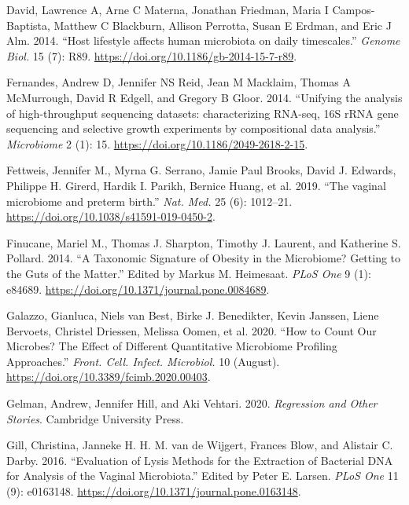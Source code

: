 \documentclass[
]{article}
\newlength{\cslhangindent}
\newlength{\cslentryspacingunit} %
\newenvironment{CSLReferences}[2] %
 {%
  \setlength{\parindent}{0pt}
  \ifodd #1
  \let\oldpar\par
  \def\par{\hangindent=\cslhangindent\oldpar}
  \fi
  \setlength{\parskip}{#2\cslentryspacingunit}
 }%
 {}
\begin{document}
\begin{CSLReferences}{1}{0}
\leavevmode{}%
David, Lawrence A, Arne C Materna, Jonathan Friedman, Maria I Campos-Baptista, Matthew C Blackburn, Allison Perrotta, Susan E Erdman, and Eric J Alm. 2014. {``{Host lifestyle affects human microbiota on daily timescales}.''} \emph{Genome Biol.} 15 (7): R89. \url{https://doi.org/10.1186/gb-2014-15-7-r89}.

\leavevmode{}%
Fernandes, Andrew D, Jennifer NS Reid, Jean M Macklaim, Thomas A McMurrough, David R Edgell, and Gregory B Gloor. 2014. {``{Unifying the analysis of high-throughput sequencing datasets: characterizing RNA-seq, 16S rRNA gene sequencing and selective growth experiments by compositional data analysis}.''} \emph{Microbiome} 2 (1): 15. \url{https://doi.org/10.1186/2049-2618-2-15}.

\leavevmode{}%
Fettweis, Jennifer M., Myrna G. Serrano, Jamie Paul Brooks, David J. Edwards, Philippe H. Girerd, Hardik I. Parikh, Bernice Huang, et al. 2019. {``{The vaginal microbiome and preterm birth}.''} \emph{Nat. Med.} 25 (6): 1012--21. \url{https://doi.org/10.1038/s41591-019-0450-2}.

\leavevmode{}%
Finucane, Mariel M., Thomas J. Sharpton, Timothy J. Laurent, and Katherine S. Pollard. 2014. {``{A Taxonomic Signature of Obesity in the Microbiome? Getting to the Guts of the Matter}.''} Edited by Markus M. Heimesaat. \emph{PLoS One} 9 (1): e84689. \url{https://doi.org/10.1371/journal.pone.0084689}.

\leavevmode{}%
Galazzo, Gianluca, Niels van Best, Birke J. Benedikter, Kevin Janssen, Liene Bervoets, Christel Driessen, Melissa Oomen, et al. 2020. {``{How to Count Our Microbes? The Effect of Different Quantitative Microbiome Profiling Approaches}.''} \emph{Front. Cell. Infect. Microbiol.} 10 (August). \url{https://doi.org/10.3389/fcimb.2020.00403}.

\leavevmode{}%
Gelman, Andrew, Jennifer Hill, and Aki Vehtari. 2020. \emph{Regression and Other Stories}. Cambridge University Press.

\leavevmode{}%
Gill, Christina, Janneke H. H. M. van de Wijgert, Frances Blow, and Alistair C. Darby. 2016. {``{Evaluation of Lysis Methods for the Extraction of Bacterial DNA for Analysis of the Vaginal Microbiota}.''} Edited by Peter E. Larsen. \emph{PLoS One} 11 (9): e0163148. \url{https://doi.org/10.1371/journal.pone.0163148}.


\end{CSLReferences}
\end{document}
